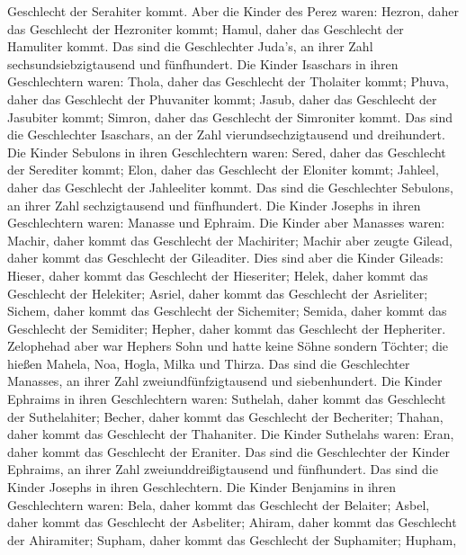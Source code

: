 Geschlecht der Serahiter kommt.  Aber die Kinder des Perez
waren: Hezron, daher das Geschlecht der Hezroniter kommt; Hamul, daher
das Geschlecht der Hamuliter kommt.  Das sind die
Geschlechter Juda's, an ihrer Zahl sechsundsiebzigtausend und
fünfhundert.  Die Kinder Isaschars in ihren Geschlechtern
waren: Thola, daher das Geschlecht der Tholaiter kommt; Phuva, daher das
Geschlecht der Phuvaniter kommt;  Jasub, daher das
Geschlecht der Jasubiter kommt; Simron, daher das Geschlecht der
Simroniter kommt.  Das sind die Geschlechter Isaschars, an
der Zahl vierundsechzigtausend und dreihundert.  Die Kinder
Sebulons in ihren Geschlechtern waren: Sered, daher das Geschlecht der
Serediter kommt; Elon, daher das Geschlecht der Eloniter kommt; Jahleel,
daher das Geschlecht der Jahleeliter kommt.  Das sind die
Geschlechter Sebulons, an ihrer Zahl sechzigtausend und fünfhundert.
 Die Kinder Josephs in ihren Geschlechtern waren: Manasse
und Ephraim.  Die Kinder aber Manasses waren: Machir, daher
kommt das Geschlecht der Machiriter; Machir aber zeugte Gilead, daher
kommt das Geschlecht der Gileaditer.  Dies sind aber die
Kinder Gileads: Hieser, daher kommt das Geschlecht der Hieseriter;
Helek, daher kommt das Geschlecht der Helekiter;  Asriel,
daher kommt das Geschlecht der Asrieliter; Sichem, daher kommt das
Geschlecht der Sichemiter;  Semida, daher kommt das
Geschlecht der Semiditer; Hepher, daher kommt das Geschlecht der
Hepheriter.  Zelophehad aber war Hephers Sohn und hatte
keine Söhne sondern Töchter; die hießen Mahela, Noa, Hogla, Milka und
Thirza.  Das sind die Geschlechter Manasses, an ihrer Zahl
zweiundfünfzigtausend und siebenhundert.  Die Kinder
Ephraims in ihren Geschlechtern waren: Suthelah, daher kommt das
Geschlecht der Suthelahiter; Becher, daher kommt das Geschlecht der
Becheriter; Thahan, daher kommt das Geschlecht der Thahaniter.
 Die Kinder Suthelahs waren: Eran, daher kommt das
Geschlecht der Eraniter.  Das sind die Geschlechter der
Kinder Ephraims, an ihrer Zahl zweiunddreißigtausend und fünfhundert.
Das sind die Kinder Josephs in ihren Geschlechtern.  Die
Kinder Benjamins in ihren Geschlechtern waren: Bela, daher kommt das
Geschlecht der Belaiter; Asbel, daher kommt das Geschlecht der
Asbeliter; Ahiram, daher kommt das Geschlecht der Ahiramiter;
 Supham, daher kommt das Geschlecht der Suphamiter; Hupham,
